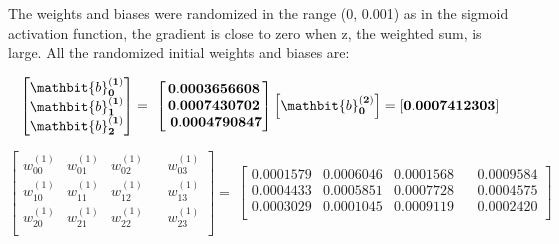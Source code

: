 \documentclass[12pt,a4paper]{article}
\begin{document}
\begin{mybox2}

The weights and biases were randomized in the range (0, 0.001) as in the sigmoid activation function, the gradient is close to zero when z, the weighted sum, is large. All the randomized initial weights and biases are:

\begin{equation}
\left[\begin{matrix}\mathbit{b}_\mathbf{0}^{\left(\mathbf{1}\right)}\\\mathbit{b}_\mathbf{1}^{\left(\mathbf{1}\right)}\\\mathbit{b}_\mathbf{2}^{\left(\mathbf{1}\right)}\\\end{matrix}\right]=\ \left[\begin{matrix}\mathbf{0}.\mathbf{0003656608}\\\mathbf{0}.\mathbf{0007430702}\\\ \mathbf{0}.\mathbf{0004790847}\\\end{matrix}\right]
	\left[\mathbit{b}_\mathbf{0}^{\left(\mathbf{2}\right)}\right]=\left[\mathbf{0}.\mathbf{0007412303}\right]
\end{equation}

\begin{equation}
\left[\begin{matrix}w_{00}^{\left(1\right)}&w_{01}^{\left(1\right)}&w_{02}^{\left(1\right)}\\w_{10}^{\left(1\right)}&w_{11}^{\left(1\right)}&w_{12}^{\left(1\right)}\\w_{20}^{\left(1\right)}&w_{21}^{\left(1\right)}&w_{22}^{\left(1\right)}\\\end{matrix}\ \ \ \ \begin{matrix}w_{03}^{\left(1\right)}\\w_{13}^{\left(1\right)}\\w_{23}^{\left(1\right)}\\\end{matrix}\right]=\ \left[\begin{matrix}0.0001579&0.0006046&0.0001568\\0.0004433&0.0005851&0.0007728\\0.0003029&0.0001045&0.0009119\\\end{matrix}\ \ \ \ \begin{matrix}0.0009584\\0.0004575\\0.0002420\\\end{matrix}\right]
\end{equation}


\end{mybox2}
\end{document}
